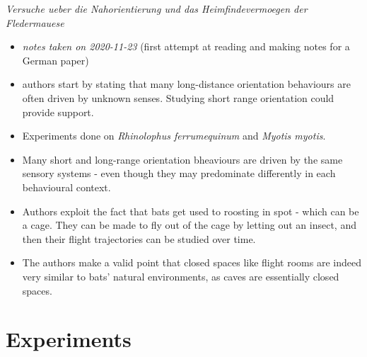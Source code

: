 \documentclass[
]{book}
\begin{document}

\emph{Versuche ueber die Nahorientierung und das Heimfindevermoegen der Fledermauese} \citep{mohres1949versuche}

\begin{itemize}
\item
  \emph{notes taken on 2020-11-23} (first attempt at reading and making notes for a German paper)
\item
  authors start by stating that many long-distance orientation behaviours are often driven by unknown senses. Studying short range orientation could provide support.
\item
  Experiments done on \emph{Rhinolophus ferrumequinum} and \emph{Myotis myotis}.
\item
  Many short and long-range orientation bheaviours are driven by the same sensory systems - even though they may predominate differently in each behavioural context.
\item
  Authors exploit the fact that bats get used to roosting in spot - which can be a cage. They can be made to fly out of the cage by letting out an insect, and then their flight trajectories can be studied over time.
\item
  The authors make a valid point that closed spaces like flight rooms are indeed very similar to bats' natural environments, as caves are essentially closed spaces.
\end{itemize}

\hypertarget{experiments}{%
\section{Experiments}\label{experiments}}
\end{document}
